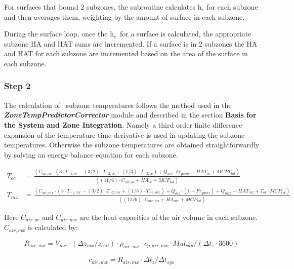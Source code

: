 For surfaces that bound 2 subzones, the subroutine calculates h\(_{c}\) for each subzone and then averages them, weighting by the amount of surface in each subzone.

During the surface loop, once the h\(_{c}\)~for a surface is calculated, the appropriate subzone HA and HAT sums are incremented. If a surface is in 2 subzones the HA and HAT for each subzone are incremented based on the area of the surface in each subzone.

\subsubsection{Step 2}\label{step-2}

The calculation of~ subzone temperatures follows the method used in the \textbf{\emph{ZoneTempPredictorCorrector}} module and described in the section \textbf{Basis for the System and Zone Integration}. Namely a third order finite difference expansion of the temperature time derivative is used in updating the subzone temperatures. Otherwise the subzone temperatures are obtained straightforwardly by solving an energy balance equation for each subzone.

\begin{equation}
  \begin{array}{cl}
    T_{oc} & = \frac{(C_{air,oc} \cdot (3 \cdot T_{ - 1,oc} - (3/2) \cdot T_{ - 2,oc} + (1/3) \cdot T_{ - 3,oc}) + \dot Q_{ocz} \cdot Fr_{gains} + HAT_{oc} + MCPT_{tot})} {((11/6) \cdot C_{air,oc} + HA_{oc} + MCP_{tot})} \\
    T_{mx} & = \frac{(C_{air,mx} \cdot (3 \cdot T_{ - 1,mx} - (3/2) \cdot T_{ - 2,mx} + (1/3) \cdot T_{ - 3,mx}) + \dot Q_{ocz} \cdot (1 - Fr_{gains}) + \dot Q_{mxz} + HAT_{mx} + T_{oc} \cdot MCP_{tot})} {((11/6) \cdot C_{air,mx} + HA_{mx} + MCP_{tot})}
  \end{array}
\end{equation}

Here \({C_{air,oc}}\) and \({C_{air,mx}}\) are the heat capacities of the air volume in each subzone. \({C_{air,mx}}\) is calculated by:

\begin{equation}
{R_{air,mx}} = {V_{mx}} \cdot \left( {\Delta {z_{mx}}/{z_{ceil}}} \right) \cdot {\rho_{air,mx}} \cdot {c_{p,air,mx}} \cdot Mu{l_{cap}}/\left( {\Delta {t_z} \cdot 3600} \right)
\end{equation}

\begin{equation}
{c_{air,mx}} = {R_{air,mx}} \cdot \Delta {t_z}/\Delta {t_{sys}}
\end{equation}

